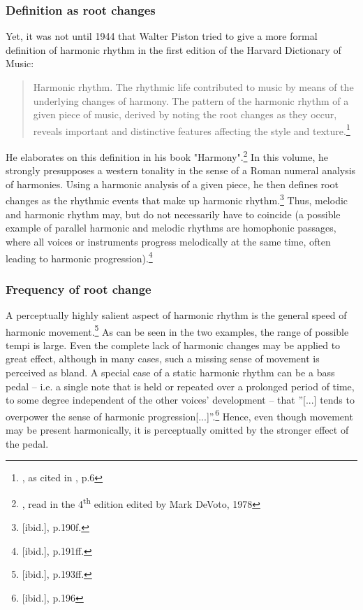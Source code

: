 \documentclass[a4paper,12pt]{report}
\begin{document}
\subsubsection{Definition as root changes}
Yet, it was not until 1944 that Walter Piston tried to give a more formal definition of harmonic rhythm in the first edition of the Harvard Dictionary of Music:
\begin{quote}
Harmonic rhythm. The rhythmic life contributed to music by means of the underlying changes of harmony. The pattern of the harmonic rhythm of a given piece of music, derived by noting the root changes as they occur, reveals important and distinctive features affecting the style and texture.\footnote{\cite{willi1944harvard}, as cited in \cite{swain2002harmonic}, p.6}
\end{quote}
He elaborates on this definition in his book "Harmony".\footnote{\cite{piston1987harmony}, read in the 4\textsuperscript{th} edition edited by Mark DeVoto, 1978} In this volume, he strongly presupposes a western tonality in the sense of a Roman numeral analysis of harmonies. Using a harmonic analysis of a given piece, he then defines root changes as the rhythmic events that make up harmonic rhythm.\footnote{[ibid.], p.190f.} Thus, melodic and harmonic rhythm may, but do not necessarily have to coincide (a possible example of parallel harmonic and melodic rhythms are homophonic passages, where all voices or instruments progress melodically at the same time, often leading to harmonic progression).\footnote{[ibid.], p.191ff.}

\subsubsection{Frequency of root change}
A perceptually highly salient aspect of harmonic rhythm is the general speed of harmonic movement.\footnote{[ibid.], p.193ff.} As can be seen in the two examples, the range of possible tempi is large. Even the complete lack of harmonic changes may be applied to great effect, although in many cases, such a missing sense of movement is perceived as bland. A special case of a static harmonic rhythm can be a bass pedal -- i.e. a single note that is held or repeated over a prolonged period of time, to some degree independent of the other voices' development -- that ''[...] tends to overpower the sense of harmonic progression[...]''.\footnote{[ibid.], p.196} Hence, even though movement may be present harmonically, it is perceptually omitted by the stronger effect of the pedal.
\end{document}
